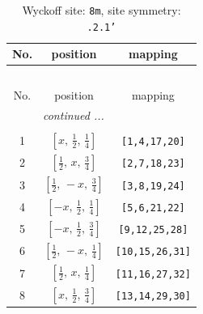 \documentclass[fleqn,8pt]{jsarticle}
\begin{document}
\begin{longtable}{ccc}
\caption{Wyckoff site: {\tt 8m}, site symmetry: {\tt .2.1'}}
 \\
 \hline \hline
No. & position & mapping \\ \hline \endfirsthead

\multicolumn{2}{l}{\tablename\ \thetable{}} \\
 \hline \hline
No. & position & mapping \\ \hline \endhead

 \hline \hline
\multicolumn{2}{r}{\footnotesize\it continued ...} \\ \endfoot

 \hline \hline
\multicolumn{2}{r}{} \\ \endlastfoot

1 & $\left[ x,\, \frac{1}{2},\, \frac{1}{4} \right]$ & {\tt [1,4,17,20]} \\ \hline
2 & $\left[ \frac{1}{2},\, x,\, \frac{3}{4} \right]$ & {\tt [2,7,18,23]} \\ \hline
3 & $\left[ \frac{1}{2},\, - x,\, \frac{3}{4} \right]$ & {\tt [3,8,19,24]} \\ \hline
4 & $\left[ - x,\, \frac{1}{2},\, \frac{1}{4} \right]$ & {\tt [5,6,21,22]} \\ \hline
5 & $\left[ - x,\, \frac{1}{2},\, \frac{3}{4} \right]$ & {\tt [9,12,25,28]} \\ \hline
6 & $\left[ \frac{1}{2},\, - x,\, \frac{1}{4} \right]$ & {\tt [10,15,26,31]} \\ \hline
7 & $\left[ \frac{1}{2},\, x,\, \frac{1}{4} \right]$ & {\tt [11,16,27,32]} \\ \hline
8 & $\left[ x,\, \frac{1}{2},\, \frac{3}{4} \right]$ & {\tt [13,14,29,30]} \\
\end{longtable}
\renewcommand{\arraystretch}{1.2}
\end{document}
